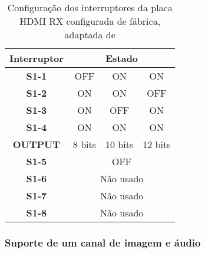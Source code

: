 \begin{table}[h!]
	\centering
	\begin{tabular}{|c|c|c|c|}
		\hline
		\textbf{Interruptor} & \multicolumn{3}{c|}{\textbf{Estado}} \\ \hline
		\textbf{S1-1}        & OFF        & ON         & ON         \\ \hline
		\textbf{S1-2}        & ON         & ON         & OFF        \\ \hline
		\textbf{S1-3}        & ON         & OFF        & ON        \\ \hline
		\textbf{S1-4}        & ON         & ON         & ON         \\ \hline
		\textbf{OUTPUT}      & 8 bits     & 10 bits    & 12 bits    \\ \hline
		\textbf{S1-5}        & \multicolumn{3}{c|}{OFF}             \\ \hline
		\textbf{S1-6}        & \multicolumn{3}{c|}{Não usado}       \\ \hline
		\textbf{S1-7}        & \multicolumn{3}{c|}{Não usado}       \\ \hline
		\textbf{S1-8}        & \multicolumn{3}{c|}{Não usado}       \\ \hline
	\end{tabular}
	\caption{Configuração dos interruptores da placa HDMI RX configurada de fábrica, adaptada de \cite{R009}}
	\label{table:HDMI_default_switches_TX}
\end{table}
\subsubsection{Suporte de um canal de imagem e áudio} \label {subsubsec:HDMIconfig+audio_switches}

